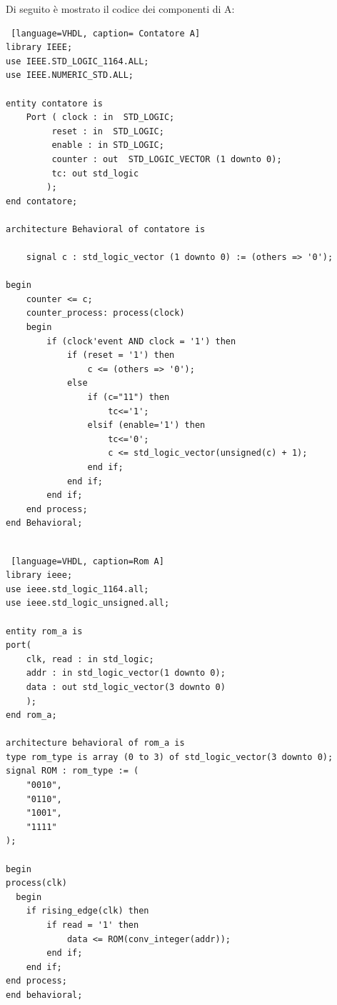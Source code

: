 Di seguito è mostrato il codice dei componenti di A:
\begin{lstlisting} [language=VHDL, caption= Contatore A]
library IEEE;
use IEEE.STD_LOGIC_1164.ALL;
use IEEE.NUMERIC_STD.ALL;

entity contatore is
    Port ( clock : in  STD_LOGIC;
         reset : in  STD_LOGIC;
         enable : in STD_LOGIC;
         counter : out  STD_LOGIC_VECTOR (1 downto 0);
         tc: out std_logic
        );
end contatore;

architecture Behavioral of contatore is

    signal c : std_logic_vector (1 downto 0) := (others => '0');

begin
    counter <= c;
    counter_process: process(clock)
    begin
        if (clock'event AND clock = '1') then
            if (reset = '1') then
                c <= (others => '0');
            else
                if (c="11") then
                    tc<='1';
                elsif (enable='1') then
                    tc<='0';
                    c <= std_logic_vector(unsigned(c) + 1);
                end if;
            end if;
        end if;
    end process;
end Behavioral;


\end{lstlisting}

\begin{lstlisting} [language=VHDL, caption=Rom A]
library ieee;
use ieee.std_logic_1164.all;
use ieee.std_logic_unsigned.all;

entity rom_a is
port(
    clk, read : in std_logic; 
    addr : in std_logic_vector(1 downto 0);
    data : out std_logic_vector(3 downto 0)
    );
end rom_a;

architecture behavioral of rom_a is 
type rom_type is array (0 to 3) of std_logic_vector(3 downto 0);
signal ROM : rom_type := (
    "0010", 
    "0110", 
    "1001", 
    "1111"
);

begin
process(clk)
  begin
    if rising_edge(clk) then
        if read = '1' then
            data <= ROM(conv_integer(addr));
        end if;
    end if;
end process;
end behavioral;
\end{lstlisting}

